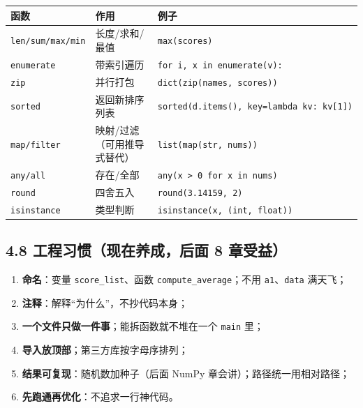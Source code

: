 {\def\LTcaptype{none} %
\begin{longtable}[]{@{}
  >{\raggedright\arraybackslash}p{}
  >{\raggedright\arraybackslash}p{}
  >{\raggedright\arraybackslash}p{}@{}}
\toprule\noalign{}
\begin{minipage}[b]{\linewidth}\raggedright
函数
\end{minipage} & \begin{minipage}[b]{\linewidth}\raggedright
作用
\end{minipage} & \begin{minipage}[b]{\linewidth}\raggedright
例子
\end{minipage} \\
\midrule\noalign{}
\endhead
\bottomrule\noalign{}
\endlastfoot
\texttt{len/sum/max/min} & 长度/求和/最值 & \texttt{max(scores)} \\
\texttt{enumerate} & 带索引遍历 &
\texttt{for\ i,\ x\ in\ enumerate(v):} \\
\texttt{zip} & 并行打包 & \texttt{dict(zip(names,\ scores))} \\
\texttt{sorted} & 返回新排序列表 &
\texttt{sorted(d.items(),\ key=lambda\ kv:\ kv{[}1{]})} \\
\texttt{map/filter} & 映射/过滤（可用推导式替代） &
\texttt{list(map(str,\ nums))} \\
\texttt{any/all} & 存在/全部 &
\texttt{any(x\ \textgreater{}\ 0\ for\ x\ in\ nums)} \\
\texttt{round} & 四舍五入 & \texttt{round(3.14159,\ 2)} \\
\texttt{isinstance} & 类型判断 &
\texttt{isinstance(x,\ (int,\ float))} \\
\end{longtable}
}

\subsection{4.8 工程习惯（现在养成，后面 8
章受益）}\label{ux5de5ux7a0bux4e60ux60efux73b0ux5728ux517bux6210ux540eux9762-8-ux7ae0ux53d7ux76ca}

\begin{enumerate}
\def\labelenumi{\arabic{enumi}.}
\tightlist
\item
  \textbf{命名}：变量 \texttt{score\_list}、函数
  \texttt{compute\_average}；不用 \texttt{a1}、\texttt{data} 满天飞；
\item
  \textbf{注释}：解释``为什么''，不抄代码本身；
\item
  \textbf{一个文件只做一件事}；能拆函数就不堆在一个 \texttt{main} 里；
\item
  \textbf{导入放顶部}；第三方库按字母序排列；
\item
  \textbf{结果可复现}：随机数加种子（后面 NumPy
  章会讲）；路径统一用相对路径；
\item
  \textbf{先跑通再优化}：不追求一行神代码。
\end{enumerate}

